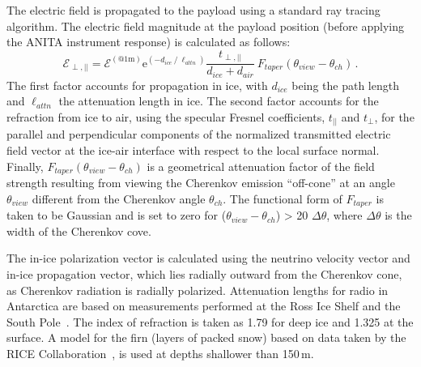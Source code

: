 
The electric field is propagated to the payload using a standard ray tracing algorithm.
The electric field magnitude at the payload position (before applying
the ANITA instrument response) is calculated as follows:
\begin{equation}
 \mathcal{E}_{\perp,||} = \mathcal{E}^{(\mathrm{@ 1m})}  
 \mathrm{e}^{(-d_{ice}\ /\ \ell_{attn})}
 \frac{t_{\perp,||}}{d_{ice} + d_{air}}
 \ F_{taper}(\theta_{view}-\theta_{ch}) \,.
\end{equation}
The first factor accounts for propagation in ice, with $d_{ice}$ being the path length and $\ell_{attn}$ the attenuation length in ice. 
The second factor accounts for the refraction from ice to air, using
the specular Fresnel coefficients, $t_{||}$ and $t_{\perp}$, for the parallel and perpendicular components of the normalized transmitted electric field vector at the ice-air interface with respect to the local surface normal.
Finally, $F_{taper}(\theta_{view}-\theta_{ch})$ is a geometrical attenuation factor of the field strength resulting from viewing the Cherenkov emission ``off-cone'' at an angle $\theta_{view}$ different from the Cherenkov angle $\theta_{ch}$.
The functional form of $F_{taper}$ is taken to be Gaussian and is set to zero for ($\theta_{view}-\theta_{ch}$) > 20 $\Delta \theta$, where $\Delta \theta$ is the width of the Cherenkov cove. 


The in-ice polarization vector is calculated using the neutrino
velocity vector and in-ice propagation vector, which lies radially
outward from the Cherenkov cone, as Cherenkov radiation is radially polarized.
Attenuation lengths for radio in Antarctica are based on measurements performed at the Ross Ice Shelf and the South Pole~\cite{smex}.
The index of refraction is taken as 1.79 for deep ice and 1.325 at the surface. A model for the firn (layers of packed snow) based on data taken by the RICE Collaboration~\cite{PhysRevD.73.082002}, is used at depths shallower than 150\,m.

